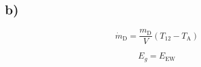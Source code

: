 

\subsection*{b)}

\[
\dot{m}_{\text{D}} = \frac{m_{\text{D}}}{V} \left( T_{12} - T_{\text{A}} \right)
\]

\[
E_g = E_{\text{EW}}
\]